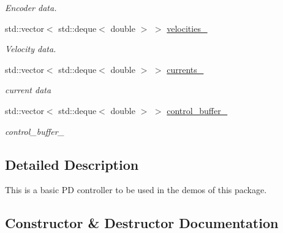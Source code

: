 \begin{DoxyCompactItemize}
\begin{DoxyCompactList}\small\item\em Encoder data. \end{DoxyCompactList}\item 
std\+::vector$<$ std\+::deque$<$ double $>$ $>$ \hyperlink{classblmc__drivers_1_1ConstTorqueControl_adb46410fc955b4232e0b11c9081409b5}{velocities\+\_\+}\hypertarget{classblmc__drivers_1_1ConstTorqueControl_adb46410fc955b4232e0b11c9081409b5}{}\label{classblmc__drivers_1_1ConstTorqueControl_adb46410fc955b4232e0b11c9081409b5}

\begin{DoxyCompactList}\small\item\em Velocity data. \end{DoxyCompactList}\item 
std\+::vector$<$ std\+::deque$<$ double $>$ $>$ \hyperlink{classblmc__drivers_1_1ConstTorqueControl_aec86c0a1864866b3169af7d9938cd518}{currents\+\_\+}\hypertarget{classblmc__drivers_1_1ConstTorqueControl_aec86c0a1864866b3169af7d9938cd518}{}\label{classblmc__drivers_1_1ConstTorqueControl_aec86c0a1864866b3169af7d9938cd518}

\begin{DoxyCompactList}\small\item\em current data \end{DoxyCompactList}\item 
std\+::vector$<$ std\+::deque$<$ double $>$ $>$ \hyperlink{classblmc__drivers_1_1ConstTorqueControl_a90f61569eda4245f7ed01569a42d0ef1}{control\+\_\+buffer\+\_\+}\hypertarget{classblmc__drivers_1_1ConstTorqueControl_a90f61569eda4245f7ed01569a42d0ef1}{}\label{classblmc__drivers_1_1ConstTorqueControl_a90f61569eda4245f7ed01569a42d0ef1}

\begin{DoxyCompactList}\small\item\em control\+\_\+buffer\+\_\+ \end{DoxyCompactList}\end{DoxyCompactItemize}


\subsection{Detailed Description}
This is a basic PD controller to be used in the demos of this package. 

\subsection{Constructor \& Destructor Documentation}
